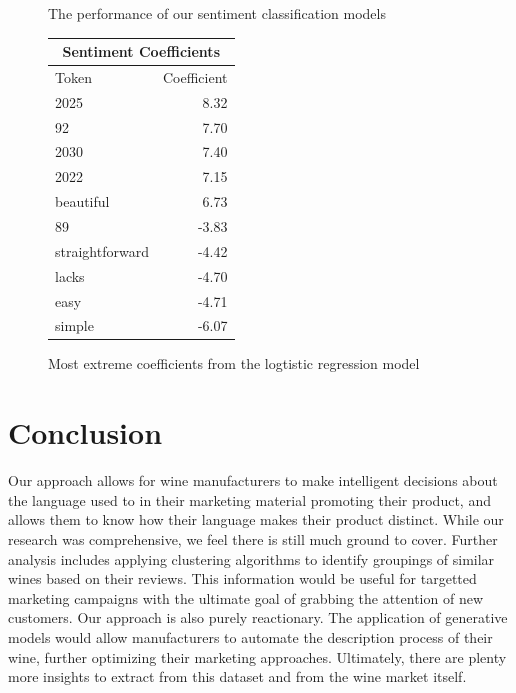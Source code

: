 \documentclass[12pt]{IEEEtran}
\begin{document}
\begin{figure}[H]
\centering
    \caption{ The performance of our sentiment classification models }
    \label{sentiment_results}
\end{figure}

\begin{figure}[H]
    \centering
    \begin{tabular}{ |l|r| }
        \hline
        \multicolumn{2}{|c|}{Sentiment Coefficients} \\
        \hline
        Token & Coefficient \\
        \hline
        2025 & 8.32 \\
        92 & 7.70 \\
        2030 & 7.40 \\
        2022 & 7.15 \\
        beautiful & 6.73 \\
        \hline
        89 & -3.83 \\
        straightforward & -4.42 \\
        lacks & -4.70 \\
        easy & -4.71 \\
        simple & -6.07 \\
        \hline
    \end{tabular}
    \caption{Most extreme coefficients from the logtistic regression model}
    \label{sentiment_coefficients}
\end{figure}
\section{Conclusion}
    Our approach allows for wine manufacturers to make intelligent decisions about the language used to in their marketing material promoting their product, and allows them to know how their language makes their product distinct. While our research was comprehensive, we feel there is still much ground to cover. Further analysis includes applying clustering algorithms to identify groupings of similar wines based on their reviews. This information would be useful for targetted marketing campaigns with the ultimate goal of grabbing the attention of new customers. Our approach is also purely reactionary. The application of generative models would allow manufacturers to automate the description process of their wine, further optimizing their marketing approaches. Ultimately, there are plenty more insights to extract from this dataset and from the wine market itself.
\end{document}
